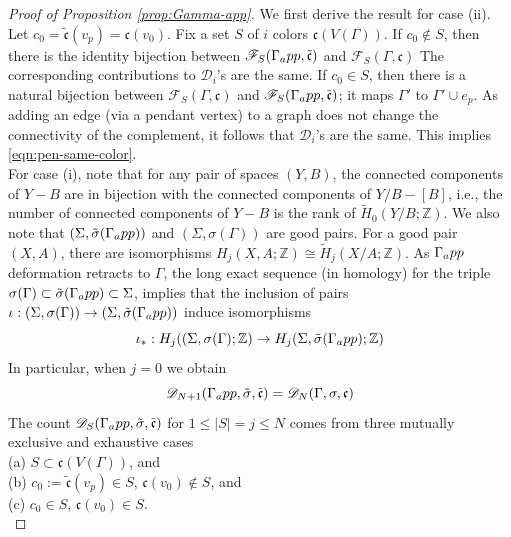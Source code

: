 \documentclass[10pt,a4paper]{amsart}
\newcommand{\hf}{\hspace*{0.5cm}}
\begin{document}
\begin{proof}[Proof of Proposition \ref{prop:Gamma-app}]
We first derive the result for case (ii). Let $c_0=\tilde{\mathfrak{c}}(v_p)=\mathfrak{c}(v_0)$. Fix a set $S$ of $i$ colors $\mathfrak{c}(V(\Gamma))$. If $c_0\not\in S$, then there is the identity bijection between $\mathscr{F}_S(\Gamma_\textup{app},\tilde{\mathfrak{c}})$ and $\mathscr{F}_S(\Gamma,\mathfrak{c})$ The corresponding contributions to $\mathscr{D}_i$'s are the same. If $c_0\in S$, then there is a natural bijection between $\mathscr{F}_S(\Gamma,\mathfrak{c})$ and $\mathscr{F}_S(\Gamma_\textup{app},\tilde{\mathfrak{c}})$; it maps $\Gamma'$ to $\Gamma'\cup e_p$. As adding an edge (via a pendant vertex) to a graph does not change the connectivity of the complement, it follows that $\mathscr{D}_i$'s are the same. This implies \eqref{eqn:pen-same-color}.\\
\hf For case (i), note that for any pair of spaces $(Y,B)$, the connected components of $Y-B$ are in bijection with the connected components of $Y/B -[B]$, i.e., the number of connected components of $Y-B$ is the rank of $\tilde{H}_0(Y/B;\mathbb{Z})$. We also note that $(\Sigma,\tilde{\sigma}(\Gamma_\textup{app}))$ and $(\Sigma,\sigma(\Gamma))$ are good pairs. For a good pair $(X,A)$, there are isomorphisms $H_j(X,A;\mathbb{Z})\cong \tilde{H}_j(X/A;\mathbb{Z})$. As $\Gamma_\textup{app}$ deformation retracts to $\Gamma$, the long exact sequence (in homology) for the triple $\sigma(\Gamma)\subset \tilde{\sigma}(\Gamma_\textup{app})\subset \Sigma$, implies that the inclusion of pairs $\iota:(\Sigma,\sigma(\Gamma))\to (\Sigma,\tilde{\sigma}(\Gamma_\textup{app}))$ induce isomorphisms
$$\iota_\ast: H_j((\Sigma,\sigma(\Gamma);\mathbb{Z})\to H_j(\Sigma,\tilde{\sigma}(\Gamma_\textup{app});\mathbb{Z})$$
In particular, when $j=0$ we obtain 
\begin{equation}\label{eqn:Dapp}
\mathscr{D}_{N+1}(\Gamma_\textup{app},\tilde{\sigma},\tilde{\mathfrak{c}})=\mathscr{D}_N(\Gamma,\sigma,\mathfrak{c})
\end{equation}
The count $\mathscr{D}_S(\Gamma_\textup{app},\tilde{\sigma},\tilde{\mathfrak{c}})$ for $1\leq |S|=j\leq N$ comes from three mutually exclusive and exhaustive cases\\
\hf (a) $S\subset \mathfrak{c}(V(\Gamma))$, and\\
\hf (b) $c_0:=\tilde{\mathfrak{c}}(v_p)\in S$, $\mathfrak{c}(v_0)\not\in S$, and\\
\hf (c) $c_0\in S$, $\mathfrak{c}(v_0)\in S$.\\

\end{proof}
\end{document}
